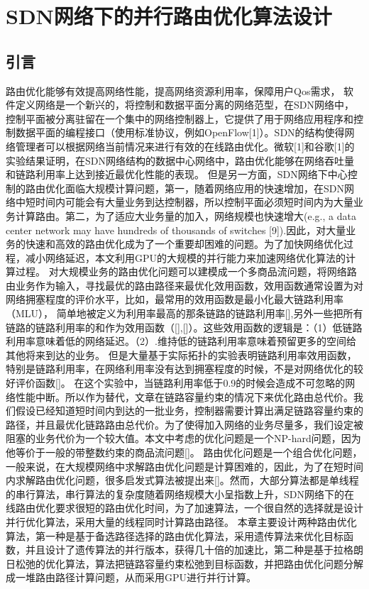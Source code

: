 
\chapter{SDN网络下的并行路由优化算法设计}
\section{引言}
路由优化能够有效提高网络性能，提高网络资源利用率，保障用户Qos需求，
软件定义网络是一个新兴的，将控制和数据平面分离的网络范型，在SDN网络中，控制平面被分离驻留在一个集中的网络控制器上，它提供了用于网络应用程序和控制数据平面的编程接口（使用标准协议，例如OpenFlow[1]）。SDN的结构使得网络管理者可以根据网络当前情况来进行有效的在线路由优化。微软[1]和谷歌[1]的实验结果证明，在SDN网络结构的数据中心网络中，路由优化能够在网络吞吐量和链路利用率上达到接近最优化性能的表现。
但是另一方面，SDN网络下中心控制的路由优化面临大规模计算问题，第一，随着网络应用的快速增加，在SDN网络中短时间内可能会有大量业务到达控制器，所以控制平面必须短时间内为大量业务计算路由。第二，为了适应大业务量的加入，网络规模也快速增大(e.g., a data center network may have hundreds of thousands of switches [9]).因此，对大量业务的快速和高效的路由优化成为了一个重要却困难的问题。为了加快网络优化过程，减小网络延迟，本文利用GPU的大规模的并行能力来加速网络优化算法的计算过程。
对大规模业务的路由优化问题可以建模成一个多商品流问题，将网络路由业务作为输入，寻找最优的路由路径来最优化效用函数，效用函数通常设置为对网络拥塞程度的评价水平，比如，最常用的效用函数是最小化最大链路利用率（MLU），
简单地被定义为利用率最高的那条链路的链路利用率[],另外一些把所有链路的链路利用率的和作为效用函数（[],[]）。这些效用函数的逻辑是：（1）低链路利用率意味着低的网络延迟。（2）.维持低的链路利用率意味着预留更多的空间给其他将来到达的业务。
但是大量基于实际拓扑的实验表明链路利用率效用函数，特别是链路利用率，在网络利用率没有达到拥塞程度的时候，不是对网络优化的较好评价函数[]。
在这个实验中，当链路利用率低于0.9的时候会造成不可忽略的网络性能中断。所以作为替代，文章在链路容量约束的情况下来优化路由总代价。我们假设已经知道短时间内到达的一批业务，控制器需要计算出满足链路容量约束的路径，并且最优化链路路由总代价。为了使得加入网络的业务尽量多，我们设定被阻塞的业务代价为一个较大值。本文中考虑的优化问题是一个NP-hard问题，因为他等价于一般的带整数约束的商品流问题[]。
路由优化问题是一个组合优化问题，一般来说，在大规模网络中求解路由优化问题是计算困难的，因此，为了在短时间内求解路由优化问题，很多启发式算法被提出来[]。然而，大部分算法都是单线程的串行算法，串行算法的复杂度随着网络规模大小呈指数上升，SDN网络下的在线路由优化要求很短的路由优化时间，为了加速算法，一个很自然的选择就是设计并行优化算法，采用大量的线程同时计算路由路径。
本章主要设计两种路由优化算法，第一种是基于备选路径选择的路由优化算法，采用遗传算法来优化目标函数，并且设计了遗传算法的并行版本，获得几十倍的加速比，第二种是基于拉格朗日松弛的优化算法，算法把链路容量约束松弛到目标函数，并把路由优化问题分解成一堆路由路径计算问题，从而采用GPU进行并行计算。
